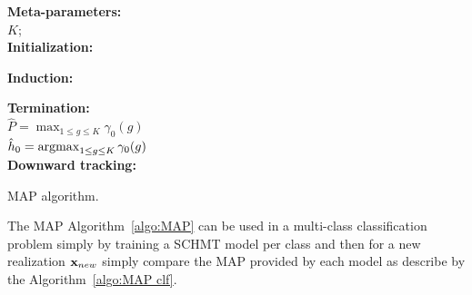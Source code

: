 \documentclass[a4paper,11pt]{report}
\begin{document}
		\begin{center}
			\begin{algorithm}
				\textbf{Meta-parameters:}\\
					$K$;\\
					
				\textbf{Initialization:}\\
					
				\textbf{Induction:}\\
				
				\textbf{Termination:}\\
					$\hat{P} = \max_{1\leq g \leq K} \gamma_{0}(g)$\\
					$\hat{h}_{0} = \mathop{\rm argmax}_{1\leq g \leq K} \gamma_{0}(g)$\\
				
				\textbf{Downward tracking:}\\
				
				\caption{MAP algorithm.}
				\label{algo:MAP}
			\end{algorithm}        
		\end{center}
		
		The MAP Algorithm~\ref{algo:MAP} can be used in a multi-class classification problem simply by training a SCHMT model per class and then for a new realization ${\bf x}_{new}$ simply compare the MAP provided by each model as describe by the Algorithm~\ref{algo:MAP clf}.
		
\end{document}
